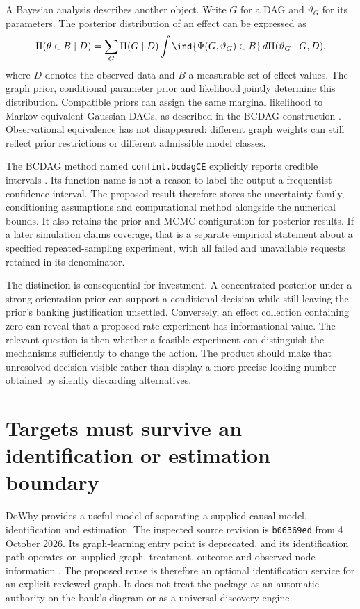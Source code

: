 A Bayesian analysis describes another object. Write $G$ for a DAG and
$\vartheta_G$ for its parameters. The posterior distribution of an effect
can be expressed as
\begin{equation}
 \Pi(\theta\in B\mid D)
 =\sum_G \Pi(G\mid D)
   \int\ind\{\Psi(G,\vartheta_G)\in B\}
            \,d\Pi(\vartheta_G\mid G,D),
 \label{exec13:posterior}
\end{equation}
where $D$ denotes the observed data and $B$ a measurable set of effect values.
The graph prior, conditional parameter prior and likelihood jointly determine
this distribution. Compatible priors can assign the same marginal likelihood
to Markov-equivalent Gaussian DAGs, as described in the BCDAG construction
\citep{exec13_bcdag_paper}. Observational equivalence has not disappeared:
different graph weights can still reflect prior restrictions or different
admissible model classes.

The BCDAG method named \texttt{confint.bcdagCE} explicitly reports credible
intervals \citep{exec13_bcdag}. Its function name is not a reason to label
the output a frequentist confidence interval. The proposed result therefore
stores the uncertainty family, conditioning assumptions and computational
method alongside the numerical bounds. It also retains the prior and MCMC
configuration for posterior results. If a later simulation claims coverage,
that is a separate empirical statement about a specified repeated-sampling
experiment, with all failed and unavailable requests retained in its denominator.

The distinction is consequential for investment. A concentrated posterior
under a strong orientation prior can support a conditional decision while
still leaving the prior's banking justification unsettled. Conversely, an
effect collection containing zero can reveal that a proposed rate experiment
has informational value. The relevant question is then whether a feasible
experiment can distinguish the mechanisms sufficiently to change the action.
The product should make that unresolved decision visible rather than display
a more precise-looking number obtained by silently discarding alternatives.

\section{Targets must survive an identification or estimation boundary}

DoWhy provides a useful model of separating a supplied causal model,
identification and estimation. The inspected source revision is
\texttt{b06369ed} from 4 October 2026. Its graph-learning entry point is
deprecated, and its identification path operates on supplied graph,
treatment, outcome and observed-node information \citep{exec13_dowhy}.
The proposed reuse is therefore an optional identification service for an
explicit reviewed graph. It does not treat the package as an automatic
authority on the bank's diagram or as a universal discovery engine.

